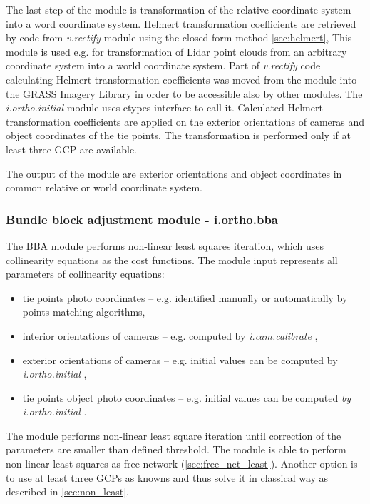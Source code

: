 \documentclass[a4paper,12pt]{article}
\newcommand{\term}[1]{%
{\it #1}%
}
\begin{document}
The last step of the module is transformation of the relative coordinate system into a word coordinate system.
Helmert 
transformation coefficients are retrieved by code from \term{v.rectify} module \cite{v.rectify} using 
the closed form method \ref{sec:helmert},
This module is used e.g. for transformation of Lidar point clouds from an arbitrary coordinate system into 
a world coordinate system. 
Part of \term{v.rectify} code calculating Helmert transformation coefficients
was moved from the module into the GRASS Imagery Library in order to be accessible also by other modules.
The \term{i.ortho.initial} module uses ctypes interface to call it.
Calculated Helmert transformation coefficients are applied on the exterior orientations of cameras and object coordinates of the tie points.
The transformation is performed only if at least three GCP are available.

The output of the module are exterior orientations and object coordinates in common relative or world coordinate system. 


\subsubsection{Bundle block adjustment module - i.ortho.bba}

The BBA module performs non-linear least squares iteration, which 
uses collinearity equations as the cost functions. 
The module input represents all parameters of collinearity equations:
\begin{itemize}
\item tie points photo coordinates -- e.g. identified manually or automatically by points matching algorithms,
\item interior orientations of cameras -- e.g. computed by \term{i.cam.calibrate},
\item exterior orientations of cameras -- e.g. initial values can be computed by \term{i.ortho.initial},
\item tie points object photo coordinates -- e.g. initial values can be computed \term{by i.ortho.initial}.
\end{itemize}

The module performs non-linear least square iteration until correction of the parameters are smaller than
defined threshold. The module is able to perform non-linear least squares as free network (\ref{sec:free_net_least}).
Another option is to use at least three GCPs 
as knowns and thus solve it in classical way as described in \ref{sec:non_least}. 
\end{document}
